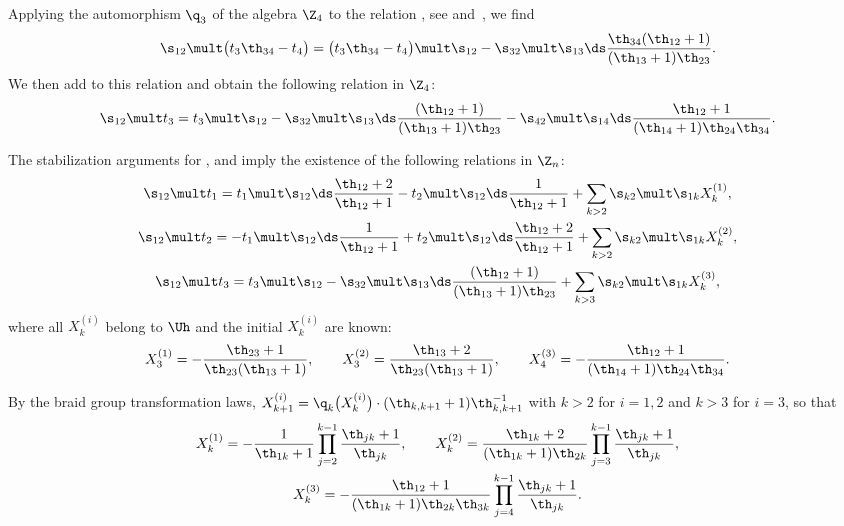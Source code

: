 Applying the automorphism $\q_3$ of the algebra $\Z_4$ to the relation , see  and~, we f\/ind
\begin{gather*}
\s_{12}\mult\big(t_3\th_{34}-t_4\big)=\big(t_3\th_{34}-t_4\big)\mult \s_{12}
-\s_{32}\mult\s_{13}  {\ds\frac{\th_{34}(\th_{12}+1)}{(\th_{13}+1)\th_{23}}}  .
\end{gather*}
We then add  to this relation  and obtain the following relation in $\Z_4$:
\begin{gather}\label{proof18}
\s_{12}\mult t_3=t_3\mult\s_{12}
-\s_{32}\mult \s_{13}  {\ds\frac{(\th_{12}+1)}{(\th_{13}+1)\th_{23}}}-
\s_{42}\mult\s_{14}  {\ds\frac{\th_{12}+1}{(\th_{14}+1)\th_{24}\th_{34}}}  .
\end{gather}

The stabilization arguments for ,  and  imply the existence of the following relations in $\Z_n$:
\begin{gather}\label{proof19}\s_{12}\mult t_1 =t_1\mult\s_{12}  {\ds\frac{\th_{12}+2}{\th_{12}+1}}-
t_2\mult\s_{12}  {\ds\frac{1}{\th_{12}+1}}+\sum_{k>2}\s_{k2}\mult\s_{1k}X_k^{(1)},\\
 \label{proof20}\s_{12}\mult t_2 =-t_1\mult\s_{12}  {\ds\frac{1}{\th_{12}+1}}+t_2\mult\s_{12}  {\ds\frac{\th_{12}+2}{\th_{12}+1}}
+\sum_{k>2}\s_{k2}\mult\s_{1k}X_k^{(2)},
\\
\label{proof21}\s_{12}\mult t_3 =t_3\mult\s_{12}-\s_{32}\mult\s_{13}  {\ds\frac{(\th_{12}+1)}{(\th_{13}+1)\th_{23}}}
+\sum_{k>3}\s_{k2}\mult\s_{1k}X_k^{(3)},
\end{gather}
where all $X_k^{(i)}$ belong to $\Uh$ and the initial $X_k^{(i)}$ are known:
\begin{gather*} X_3^{(1)} =-\frac{\th_{23}+1}{\th_{23}(\th_{13}+1)}  ,\qquad
X_3^{(2)} =\frac{\th_{13}+2}{\th_{23}(\th_{13}+1)}  ,\qquad
X_4^{(3)} =-\frac{\th_{12}+1}{(\th_{14}+1)\th_{24}\th_{34}}  .
\end{gather*}

By the braid group transformation laws, $X_{k+1}^{(i)}=\q_k\big(X_k^{(i)}\big)\cdot(\th_{k,k+1}+1)\th_{k,k+1}^{-1}$
with $k>2$ for $i=1,2$ and $k>3$ for $i=3$, so that
\begin{gather*}%
X_k^{(1)}=-\frac{1}{\th_{1k}+1}\prod_{j=2}^{k-1}\frac{\th_{jk}+1}{\th_{jk}} ,\qquad
X_k^{(2)}=\frac{\th_{1k}+2}{(\th_{1k}+1)\th_{2k}}\prod_{j=3}^{k-1}
\frac{\th_{jk}+1}{\th_{jk}}  ,\\
X_k^{(3)}=-\frac{\th_{12}+1}{(\th_{1k}+1)\th_{2k}\th_{3k}}\prod_{j=4}^{k-1}
\frac{\th_{jk}+1}{\th_{jk}}  .
\end{gather*}

